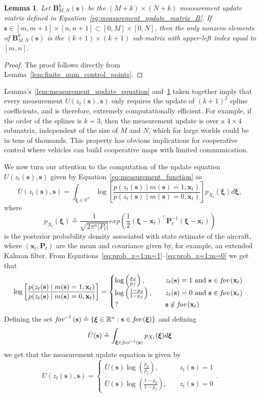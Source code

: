 \documentclass{article}
\newtheorem{lemma}[theorem]{Lemma}
\newcommand{\defeq}{\circeq}
\newcommand{\fov}[1]{\text{\em fov}\left(#1\right)}
\newcommand{\fovinv}[1]{\text{\em fov}^{-1}\left(#1\right)}
\newcommand{\sbf}{\mathbf{s}}
\newcommand{\xbf}{\mathbf{x}}
\newcommand{\Pbf}{\mathbf{P}}
\newcommand{\xibf}{\boldsymbol{\xi}}
\begin{document}
\begin{lemma} \label{lem:B_is_sparse}
Let $\mathbf{B}_{M,N}^k(\sbf)$
be the $(M+k)\times(N+k)$ measurement update matrix defined in Equation~\eqref{eq:measurement_update_matrix_B}.  
If $\sbf \in [m, m+1]\times[n, n+1] \subset [0, M]\times[0,N]$, then the only nonzero elements of $\mathbf{B}_{M,N}^k(\sbf)$ is the $(k+1)\times(k+1)$ sub-matrix with upper-left index equal to $[m,n]$.
\end{lemma}
\begin{proof}
The proof follows directly from Lemma~\ref{lem:finite_num_control_points}.	
\end{proof}

Lemma's~\ref{lem:measurement_update_equation} and~\ref{lem:B_is_sparse} taken together imply that every measurement $U(z_t(\sbf), \sbf)$ only requires the update of $(k+1)^2$ spline coefficients, and is therefore, extremely computationally efficient.  For example, if the order of the splines is $k=3$, then the measurement update is over a $4\times 4$ submatrix, independent of the size of $M$ and $N$, which for large worlds could be in tens of thousands.  This property has obvious implications for cooperative control where vehicles can build cooperative maps with limited communication.  


We now turn our attention to the computation of the update equation $U(z_t(\sbf), \sbf)$ given by Equation~\eqref{eq:measurement_function} as
\[
U(z_t(\sbf), \sbf) = \int_{\xibf\in\mathbb{R}^n}\log\left[ \frac{p(z_t(\sbf)\mid m(\sbf)=1, \xbf_t)}{p(z_t(\sbf)\mid m(\sbf)=0, \xbf_t)}\right]p_{X_t}(\xibf)d\xibf,
\]
where 
\[
p_{X_t}(\xibf) \defeq \frac{1}{\sqrt{2\pi^n|P_t|}}exp\left(\frac{1}{2}(\xibf-\xbf_t)^\top \Pbf_t^{-1} (\xibf-\xbf_t)\right)
\]
is the posterior probability density associated with state estimate of the aircraft, where $(\xbf_t, \Pbf_t)$ are the mean and covariance given by, for example, an extended Kalman filter.
From Equations~\eqref{eq:prob_z=1:m=1}--\eqref{eq:prob_z=1:m=0} we get that 
\[
\log\left[ \frac{p(z_t(\sbf)\mid m(\sbf)=1, \xbf_t)}{p(z_t(\sbf)\mid m(\sbf)=0, \xbf_t)}\right] 
	= \begin{cases}
 		\log\left(\frac{p_d}{p_f}\right), &\quad z_t(\sbf)=1 \text{~and~} \sbf\in\fov{\xbf_t} \\
 		\log\left(\frac{1-p_d}{1-p_f}\right), &\quad z_t(\sbf)=0 \text{~and~} \sbf\in\fov{\xbf_t} \\
 		? &\quad \sbf\not\in\fov{\xbf_t}
 	  \end{cases}.
\]
Defining the set $\fovinv{\sbf}\defeq\{\xibf\in\mathbb{R}^n: \sbf\in\fov{\xibf}\}$ and defining 
\begin{equation}\label{eq:Ubar}
\bar{U}(\sbf) \defeq \int_{\xibf\in\fovinv{\sbf}} p_{X_t}(\xibf)d\xibf
\end{equation}
we get that the measurement update equation is given by
\[
U(z_t(\sbf), \sbf) = 
	\begin{cases}
 		\bar{U}(\sbf)\log\left(\frac{p_d}{p_f}\right), &\quad z_t(\sbf)=1 \\
 		\bar{U}(\sbf)\log\left(\frac{1-p_d}{1-p_f}\right), &\quad z_t(\sbf)=0
 	  \end{cases}.
\]
\end{document}
